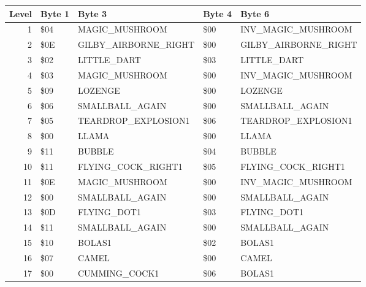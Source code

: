 \begin{figure}[H]
  {
  \setlength{\tabcolsep}{3.0pt}
  \setlength\cmidrulewidth{\heavyrulewidth} %
  \begin{adjustbox}{width=\textwidth}

\begin{tabular}{rllll}
\toprule
   Level & Byte 1    & Byte 3               & Byte 4    & Byte 6               \\
\midrule
       1 & \$04       & MAGIC\_MUSHROOM       & \$00       & INV\_MAGIC\_MUSHROOM   \\
       2 & \$0E       & GILBY\_AIRBORNE\_RIGHT & \$00       & GILBY\_AIRBORNE\_RIGHT \\
       3 & \$02       & LITTLE\_DART          & \$03       & LITTLE\_DART          \\
       4 & \$03       & MAGIC\_MUSHROOM       & \$00       & INV\_MAGIC\_MUSHROOM   \\
       5 & \$09       & LOZENGE              & \$00       & LOZENGE              \\
       6 & \$06       & SMALLBALL\_AGAIN      & \$00       & SMALLBALL\_AGAIN      \\
       7 & \$05       & TEARDROP\_EXPLOSION1  & \$06       & TEARDROP\_EXPLOSION1  \\
       8 & \$00       & LLAMA                & \$00       & LLAMA                \\
       9 & \$11       & BUBBLE               & \$04       & BUBBLE               \\
      10 & \$11       & FLYING\_COCK\_RIGHT1   & \$05       & FLYING\_COCK\_RIGHT1   \\
      11 & \$0E       & MAGIC\_MUSHROOM       & \$00       & INV\_MAGIC\_MUSHROOM   \\
      12 & \$00       & SMALLBALL\_AGAIN      & \$00       & SMALLBALL\_AGAIN      \\
      13 & \$0D       & FLYING\_DOT1          & \$03       & FLYING\_DOT1          \\
      14 & \$11       & SMALLBALL\_AGAIN      & \$00       & SMALLBALL\_AGAIN      \\
      15 & \$10       & BOLAS1               & \$02       & BOLAS1               \\
      16 & \$07       & CAMEL                & \$00       & CAMEL                \\
      17 & \$00       & CUMMING\_COCK1        & \$06       & BOLAS1               \\

\end{tabular}
\end{adjustbox}}
\end{figure}
